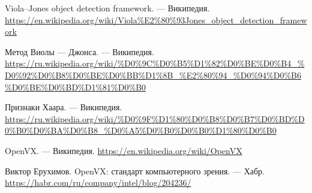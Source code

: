 \documentclass[14pt,a4paper]{scrartcl}
\begin{document}
\begin{thebibliography}{9}
	Viola–Jones object detection framework.
	\newblock --- Википедия. \url{https://en.wikipedia.org/wiki/Viola%E2%80%93Jones_object_detection_framework}
		
	Метод Виолы — Джонса.
	\newblock --- Википедия. \url{https://ru.wikipedia.org/wiki/%D0%9C%D0%B5%D1%82%D0%BE%D0%B4_%D0%92%D0%B8%D0%BE%D0%BB%D1%8B_%E2%80%94_%D0%94%D0%B6%D0%BE%D0%BD%D1%81%D0%B0}
		
	Признаки Хаара.
	\newblock --- Википедия. \url{https://ru.wikipedia.org/wiki/%D0%9F%D1%80%D0%B8%D0%B7%D0%BD%D0%B0%D0%BA%D0%B8_%D0%A5%D0%B0%D0%B0%D1%80%D0%B0}
		
	OpenVX.
	\newblock --- Википедия. \url{https://en.wikipedia.org/wiki/OpenVX}		
	
	Виктор Ерухимов. OpenVX: стандарт компьютерного зрения.
	\newblock --- Хабр. \url{https://habr.com/ru/company/intel/blog/204236/}
	
	
\end{thebibliography}
\end{document}
